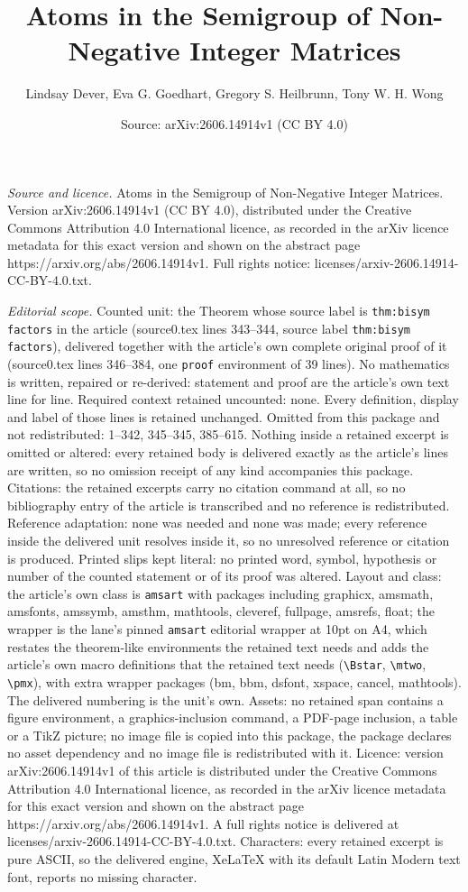 \documentclass[10pt,a4paper]{amsart}
\title[Atoms in the Semigroup of Non-Negative Integer Matrices]{Atoms in the Semigroup of Non-Negative Integer Matrices}
\author{Lindsay Dever, Eva G. Goedhart, Gregory S. Heilbrunn, Tony W. H. Wong}
\date{Source: arXiv:2606.14914v1 (CC BY 4.0)}
\begin{document}
\maketitle

\noindent\emph{Source and licence.} Atoms in the Semigroup of Non-Negative Integer Matrices. Version arXiv:2606.14914v1 (CC BY 4.0), distributed under the Creative Commons Attribution 4.0 International licence, as recorded in the arXiv licence metadata for this exact version and shown on the abstract page https://arxiv.org/abs/2606.14914v1. Full rights notice: licenses/arxiv-2606.14914-CC-BY-4.0.txt.\par\smallskip

\noindent\textit{Editorial scope.} Counted unit: the Theorem whose source label is \texttt{thm:bisym factors} in the article (source0.tex lines 343--344, source label \texttt{thm:bisym factors}), delivered together with the article's own complete original proof of it (source0.tex lines 346--384, one \texttt{proof} environment of 39 lines). No mathematics is written, repaired or re-derived: statement and proof are the article's own text line for line. Required context retained uncounted: none. Every definition, display and label of those lines is retained unchanged. Omitted from this package and not redistributed: 1--342, 345--345, 385--615. Nothing inside a retained excerpt is omitted or altered: every retained body is delivered exactly as the article's lines are written, so no omission receipt of any kind accompanies this package. Citations: the retained excerpts carry no citation command at all, so no bibliography entry of the article is transcribed and no reference is redistributed. Reference adaptation: none was needed and none was made; every reference inside the delivered unit resolves inside it, so no unresolved reference or citation is produced. Printed slips kept literal: no printed word, symbol, hypothesis or number of the counted statement or of its proof was altered. Layout and class: the article's own class is \texttt{amsart} with packages including graphicx, amsmath, amsfonts, amssymb, amsthm, mathtools, cleveref, fullpage, amsrefs, float; the wrapper is the lane's pinned \texttt{amsart} editorial wrapper at 10pt on A4, which restates the theorem-like environments the retained text needs and adds the article's own macro definitions that the retained text needs (\texttt{\textbackslash Bstar}, \texttt{\textbackslash mtwo}, \texttt{\textbackslash pmx}), with extra wrapper packages (bm, bbm, dsfont, xspace, cancel, mathtools). The delivered numbering is the unit's own. Assets: no retained span contains a figure environment, a graphics-inclusion command, a PDF-page inclusion, a table or a TikZ picture; no image file is copied into this package, the package declares no asset dependency and no image file is redistributed with it. Licence: version arXiv:2606.14914v1 of this article is distributed under the Creative Commons Attribution 4.0 International licence, as recorded in the arXiv licence metadata for this exact version and shown on the abstract page https://arxiv.org/abs/2606.14914v1. A full rights notice is delivered at licenses/arxiv-2606.14914-CC-BY-4.0.txt. Characters: every retained excerpt is pure ASCII, so the delivered engine, XeLaTeX with its default Latin Modern text font, reports no missing character.
\end{document}
